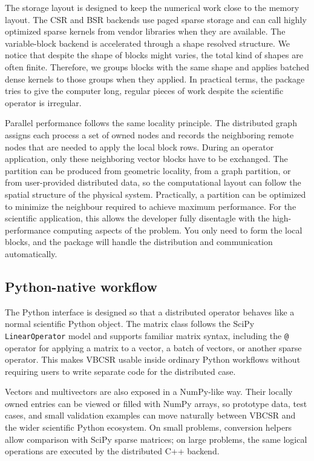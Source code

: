 \documentclass[
reprint,
superscriptaddress,
frontmatterverbose,
amsmath,amssymb,
pra,
]{revtex4-2}
\begin{document}
The storage layout is designed to keep the numerical work close to the memory
layout.  The CSR and BSR backends use paged sparse storage and can call highly
optimized sparse kernels from vendor libraries when they are available.  The 
variable-block backend is accelerated through a shape resolved structure. We notice that despite the shape of blocks might varies, the total kind of shapes are often finite. Therefore, we groups blocks with the same shape and applies batched dense kernels to those groups when they applied.  In practical terms, the package tries to give the computer long, regular pieces of work despite the scientific operator is irregular.

Parallel performance follows the same locality principle.  The distributed
graph assigns each process a set of owned nodes and records the neighboring
remote nodes that are needed to apply the local block rows.  During an
operator application, only these neighboring vector blocks have to be
exchanged.  The partition can be produced from geometric locality, from a graph
partition, or from user-provided distributed data, so the computational layout
can follow the spatial structure of the physical system. Practically, a partition can be optimized to minimize the neighbour required to achieve maximum performance.  For the scientific
application, this allows the developer fully disentagle with the high-performance computing aspects of the problem. You only need to form the local blocks, and the package will handle the distribution and communication automatically.

\subsection{Python-native workflow}

The Python interface is designed so that a distributed operator behaves like a
normal scientific Python object.  The matrix class follows the SciPy
\texttt{LinearOperator} model and supports familiar matrix syntax, including
the \texttt{@} operator for applying a matrix to a vector, a batch of vectors,
or another sparse operator.  This makes VBCSR usable inside ordinary Python
workflows without requiring users to write separate code for the distributed
case.

Vectors and multivectors are also exposed in a NumPy-like way.  Their locally
owned entries can be viewed or filled with NumPy arrays, so prototype data,
test cases, and small validation examples can move naturally between VBCSR and
the wider scientific Python ecosystem.  On small problems, conversion helpers
allow comparison with SciPy sparse matrices; on large problems, the same
logical operations are executed by the distributed C++ backend.
\end{document}
